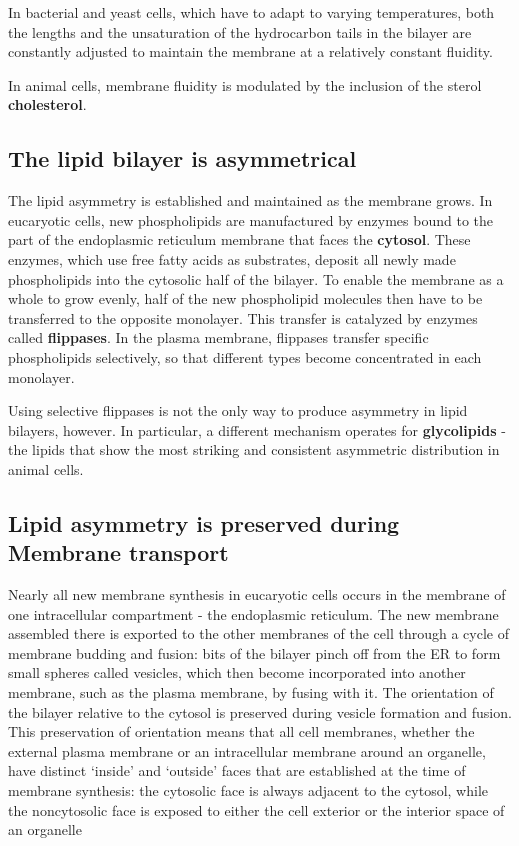 In bacterial and yeast cells, which have to adapt to varying temperatures,
both the lengths and the unsaturation of the hydrocarbon tails in the
bilayer are constantly adjusted to maintain the membrane at a relatively
constant fluidity.

In animal cells, membrane fluidity is modulated by the inclusion of the
sterol \textbf{cholesterol}.

\subsection{The lipid bilayer is asymmetrical}

The lipid asymmetry is established and maintained as the membrane
grows. In eucaryotic cells, new phospholipids are manufactured by
enzymes bound to the part of the endoplasmic reticulum membrane that
faces the \textbf{cytosol}. These enzymes, which use free fatty acids as substrates,
deposit all newly made phospholipids into the
cytosolic half of the bilayer. To enable the membrane as a whole to grow
evenly, half of the new phospholipid molecules then have to be transferred
to the opposite monolayer. This transfer is catalyzed by enzymes
called \textbf{flippases}. In the plasma membrane, flippases transfer
specific phospholipids selectively, so that different types become concentrated
in each monolayer.

Using selective flippases is not the only way to produce asymmetry in
lipid bilayers, however. In particular, a different mechanism operates for
\textbf{glycolipids} - the lipids that show the most striking and consistent asymmetric
distribution in animal cells.

\subsection{Lipid asymmetry is preserved during Membrane transport}

Nearly all new membrane synthesis in eucaryotic cells occurs in the
membrane of one intracellular compartment - the endoplasmic reticulum.
The new membrane assembled there is exported
to the other membranes of the cell through a cycle of membrane budding
and fusion: bits of the bilayer pinch off from the ER to form small spheres
called vesicles, which then become incorporated into another membrane,
such as the plasma membrane, by fusing with it. The orientation
of the bilayer relative to the cytosol is preserved during vesicle
formation and fusion. This preservation of orientation means that all cell
membranes, whether the external plasma membrane or an intracellular
membrane around an organelle, have distinct ‘inside’ and ‘outside’ faces
that are established at the time of membrane synthesis: the cytosolic face
is always adjacent to the cytosol, while the noncytosolic face is exposed
to either the cell exterior or the interior space of an organelle

